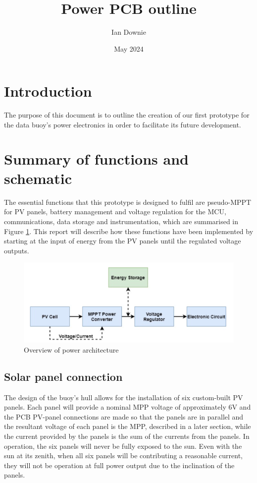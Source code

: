 \documentclass{article}
\begin{document}
\title{Power PCB outline}
\author{Ian Downie}
\date{May 2024}
\maketitle



\newpage
\section{Introduction}

The purpose of this document is to outline the creation of our first prototype for the data buoy's power electronics in order to facilitate its future development.

\section{Summary of functions and schematic}

The essential functions that this prototype is designed to fulfil are pseudo-MPPT for PV panels, battery management and voltage regulation for the MCU, communications, data storage and instrumentation, which are summarised in Figure \ref{fig:mesh1}. This report will describe how these functions have been implemented by starting at the input of energy from the PV panels until the regulated voltage outputs.

\begin{figure}[h]
	\centering
   	 \includegraphics[width=\linewidth]{Energy-Storage}
	\caption{Overview of power architecture}
	\label{fig:mesh1}
\end{figure}



\subsection{Solar panel connection}

The design of the buoy's hull allows for the installation of six custom-built PV panels. Each panel will provide a nominal MPP voltage of approximately 6V and the PCB PV-panel connections are made so that the panels are in parallel and the resultant voltage of each panel is the MPP, described in a later section, while the current provided by the panels is the sum of the currents from the panels. In operation, the six panels will never be fully exposed to the sun. Even with the sun at its zenith, when all six panels will be contributing a reasonable current, they will not be operation at full power output due to the inclination of the panels. 
\end{document}
